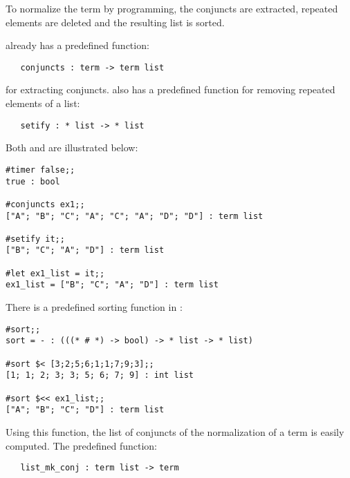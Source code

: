 To normalize the term by \ML{} programming, the conjuncts are extracted,
repeated elements are deleted and the resulting list is sorted.

\HOL{} already has a predefined function:

\begin{hol}\begin{verbatim}
   conjuncts : term -> term list
\end{verbatim}\end{hol}

\noindent for extracting conjuncts.
\HOL{} also has a predefined \ML{} function for removing repeated elements of
a list:


\begin{hol}\begin{verbatim}
   setify : * list -> * list
\end{verbatim}\end{hol}

\noindent Both  and  are illustrated below:

\begin{session}\begin{verbatim}
#timer false;;
true : bool

#conjuncts ex1;;
["A"; "B"; "C"; "A"; "C"; "A"; "D"; "D"] : term list

#setify it;;
["B"; "C"; "A"; "D"] : term list

#let ex1_list = it;;
ex1_list = ["B"; "C"; "A"; "D"] : term list
\end{verbatim}\end{session}

There is a predefined sorting function in \ML:

\begin{session}\begin{verbatim}
#sort;;
sort = - : (((* # *) -> bool) -> * list -> * list)

#sort $< [3;2;5;6;1;1;7;9;3];;
[1; 1; 2; 3; 3; 5; 6; 7; 9] : int list

#sort $<< ex1_list;;
["A"; "B"; "C"; "D"] : term list
\end{verbatim}\end{session}

Using this function, the list of conjuncts of the normalization of a
term is easily computed.  The predefined \ML{} function:

\begin{hol}\begin{verbatim}
   list_mk_conj : term list -> term
\end{verbatim}\end{hol}

